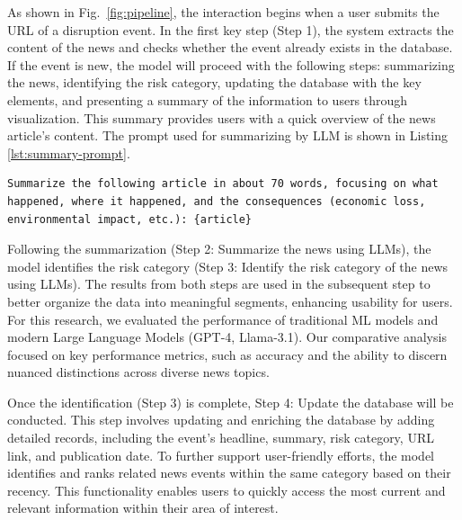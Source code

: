 As shown in Fig.~\ref{fig:pipeline}, the interaction begins when a user submits the URL of a disruption event. In the first key step (Step 1), the system extracts the content of the news and checks whether the event already exists in the database. If the event is new, the model will proceed with the following steps: summarizing the news, identifying the risk category, updating the database with the key elements, and presenting a summary of the information to users through visualization. This summary provides users with a quick overview of the news article’s content.
The prompt used for summarizing by LLM is shown in Listing \ref{lst:summary-prompt}.

\vspace{1.5\baselineskip}
\begin{lstlisting}[caption={Prompt for LLM Summarization}, 
                   label={lst:summary-prompt}, 
                   breaklines=true, 
                   basicstyle=\footnotesize\ttfamily, 
                   xleftmargin=0pt, 
                   framexleftmargin=0pt, 
                   framesep=0pt, 
                   aboveskip=0pt, 
                   belowskip=0pt, 
                   showspaces=false, 
                   showstringspaces=false,
                   keepspaces=true,
                   breakindent=0pt]
Summarize the following article in about 70 words, focusing on what happened, where it happened, and the consequences (economic loss, environmental impact, etc.): {article}
\end{lstlisting}

Following the summarization (Step 2: Summarize the news using LLMs), the model identifies the risk category (Step 3: Identify the risk category of the news using LLMs). The results from both steps are used in the subsequent step to better organize the data into meaningful segments, enhancing usability for users. For this research, we evaluated the performance of traditional ML models and modern Large Language Models (GPT-4, Llama-3.1). Our comparative analysis focused on key performance metrics, such as accuracy and the ability to discern nuanced distinctions across diverse news topics.

Once the identification (Step 3) is complete, Step 4: Update the database will be conducted. This step involves updating and enriching the database by adding detailed records, including the event's headline, summary, risk category, URL link, and publication date. To further support user-friendly efforts, the model identifies and ranks related news events within the same category based on their recency. This functionality enables users to quickly access the most current and relevant information within their area of interest.

